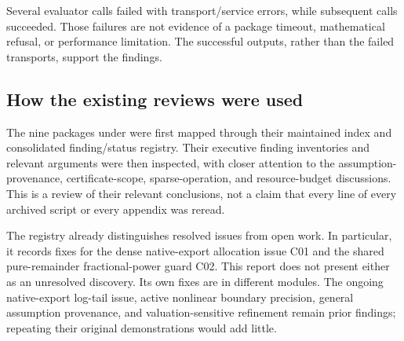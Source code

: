 \documentclass[11pt,a4paper]{article}
\begin{document}
Several evaluator calls failed with transport/service errors, while subsequent calls succeeded. Those failures are not evidence of a package timeout, mathematical refusal, or performance limitation. The successful outputs, rather than the failed transports, support the findings.

\subsection{How the existing reviews were used}
The nine packages under  were first mapped through their maintained index and consolidated finding/status registry. Their executive finding inventories and relevant arguments were then inspected, with closer attention to the assumption-provenance, certificate-scope, sparse-operation, and resource-budget discussions. This is a review of their relevant conclusions, not a claim that every line of every archived script or every appendix was reread.\cite{review-index,review-status,r1,r2,r3,r4,r5,r6,r7,r8,r9}

The registry already distinguishes resolved issues from open work. In particular, it records fixes for the dense native-export allocation issue C01 and the shared pure-remainder fractional-power guard C02. This report does not present either as an unresolved discovery. Its own fixes are in different modules. The ongoing native-export log-tail issue, active nonlinear boundary precision, general assumption provenance, and valuation-sensitive refinement remain prior findings; repeating their original demonstrations would add little.\cite{review-status}
\end{document}
